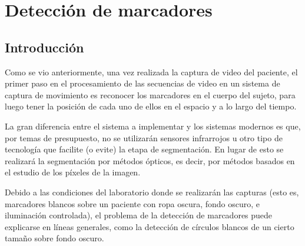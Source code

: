 \chapter{Detección de marcadores}\label{deteccionMarcadoresSec}


\section{Introducción}
Como se vio anteriormente, una vez realizada la captura de video del paciente, el primer paso en el procesamiento de las secuencias de video en un sistema de captura de movimiento es reconocer los marcadores en el cuerpo del sujeto, para luego tener la posición de cada uno de ellos en el espacio y a lo largo del tiempo. 

La gran diferencia entre el sistema a implementar y los sistemas modernos es que, por temas de presupuesto, no se utilizarán sensores infrarrojos u otro tipo de tecnología que facilite (o evite) la etapa de segmentación. En lugar de esto se realizará la segmentación por métodos ópticos, es decir, por métodos basados en el estudio de los píxeles de la imagen. 

Debido a las condiciones del laboratorio donde se realizarán las capturas (esto es, marcadores blancos sobre un paciente con ropa oscura, fondo oscuro, e iluminación controlada), el problema de la detección de marcadores puede explicarse en líneas generales, como la detección de círculos blancos de un cierto tamaño sobre fondo oscuro.

